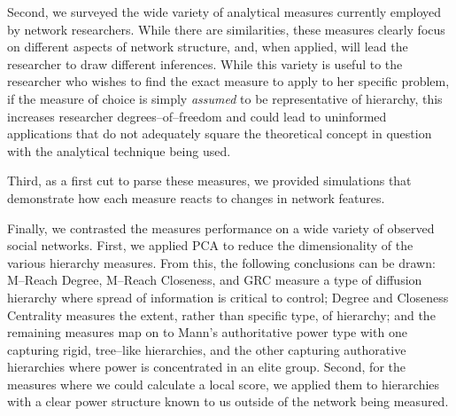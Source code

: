 \documentclass[3p,times]{elsarticle}
\begin{document}
Second, we surveyed the wide variety of analytical measures currently employed by network researchers. While there are similarities, these measures clearly focus on different aspects of network structure, and, when applied, will lead the researcher to draw different inferences. While this variety is useful to the researcher who wishes to find the exact measure to apply to her specific problem, if the measure of choice is simply \emph{assumed} to be representative of hierarchy, this increases researcher degrees--of--freedom and could lead to uninformed applications that do not adequately square the theoretical concept in question with the analytical technique being used.

Third, as a first cut to parse these measures, we provided simulations that demonstrate how each measure reacts to changes in network features. %

Finally, we contrasted the measures performance on a wide variety of observed social networks. First, we applied PCA to reduce the dimensionality of the various hierarchy measures. From this, the following conclusions can be drawn: M--Reach Degree, M--Reach Closeness, and GRC measure a type of diffusion hierarchy where spread of information is critical to control; Degree and Closeness Centrality measures the extent, rather than specific type, of hierarchy; and the remaining measures map on to Mann's authoritative power type with one capturing rigid, tree--like hierarchies, and the other capturing authorative hierarchies where power is concentrated in an elite group. Second, for the measures where we could calculate a local score, we applied them to hierarchies with a clear power structure known to us outside of the network being measured. %

%
\clearpage

\end{document}
